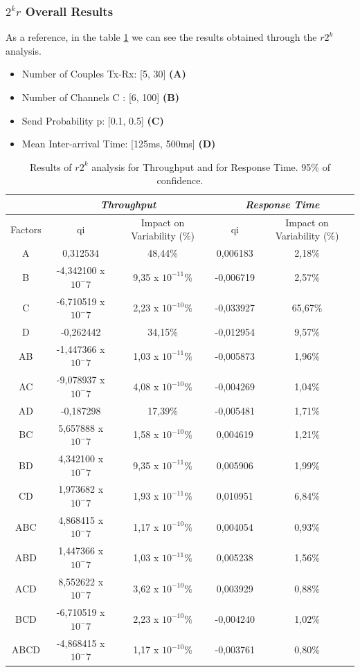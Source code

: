 \subsubsection{$2^kr$ Overall Results}
As a reference, in the table \ref{tab: 2kr_results} we can see the results obtained through the $r2^k$ analysis.
\begin{itemize}
	\item Number of Couples Tx-Rx: [5, 30] \textbf{(A)}
	\item Number of Channels C : [6, 100] \textbf{(B)}
	\item Send Probability p: [0.1, 0.5] \textbf{(C)}
	\item Mean Inter-arrival Time: [125ms, 500ms] \textbf{(D)}    
\end{itemize}
\begin{table}[H]
	\centering
	\begin{tabular}{|c|c|c|c|c|}
		\hline
		\textbf{} & \multicolumn{2}{c|}{\textit{\textbf{Throughput}}} & \multicolumn{2}{c|}{\textit{\textbf{Response Time}}} \\ \hline
		Factors   & qi          & Impact on Variability (\%)          & qi            & Impact on Variability (\%)           \\ \hline
		A    & 0,312534      & 48,44\%    & 0,006183  & 2,18\%  \\ \hline
		B    & -4,342100 x $10^-7$ & 9,35 x $10^{-11}$\% & -0,006719 & 2,57\%  \\ \hline
		C    & -6,710519 x $10^-7$ & 2,23 x $10^{-10}$\% & -0,033927 & 65,67\% \\ \hline
		D    & -0,262442     & 34,15\%    & -0,012954 & 9,57\%  \\ \hline
		AB   & -1,447366 x $10^-7$ & 1,03 x $10^{-11}$\% & -0,005873 & 1,96\%  \\ \hline
		AC   & -9,078937 x $10^-7$ & 4,08 x $10^{-10}$\% & -0,004269 & 1,04\%  \\ \hline
		AD   & -0,187298     & 17,39\%    & -0,005481 & 1,71\%  \\ \hline
		BC   & 5,657888 x $10^-7$  & 1,58 x $10^{-10}$\% & 0,004619  & 1,21\%  \\ \hline
		BD   & 4,342100 x $10^-7$  & 9,35 x $10^{-11}$\% & 0,005906  & 1,99\%  \\ \hline
		CD   & 1,973682 x $10^-7$  & 1,93 x $10^{-11}$\% & 0,010951  & 6,84\%  \\ \hline
		ABC  & 4,868415 x $10^-7$  & 1,17 x $10^{-10}$\% & 0,004054  & 0,93\%  \\ \hline
		ABD  & 1,447366 x $10^-7$  & 1,03 x $10^{-11}$\% & 0,005238  & 1,56\%  \\ \hline
		ACD  & 8,552622 x $10^-7$  & 3,62 x $10^{-10}$\% & 0,003929  & 0,88\%  \\ \hline
		BCD  & -6,710519 x $10^-7$ & 2,23 x $10^{-10}$\% & -0,004240 & 1,02\%  \\ \hline
		ABCD & -4,868415 x $10^-7$ & 1,17 x $10^{-10}$\% & -0,003761 & 0,80\%  \\ \hline
	\end{tabular}
	\caption{Results of $r2^k$ analysis for Throughput and for Response Time. 95\% of confidence.}
	\label{tab: 2kr_results}
\end{table}
																
